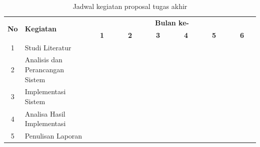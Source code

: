  
\begin{table}[h!]
  \centering
    \caption{Jadwal kegiatan proposal tugas akhir}
  \label{Novella}
  \begin{tabular}{|c|m{2.5cm}|m{0.01cm}|m{0.01cm}|m{0.01cm}|m{0.01cm}|m{0.01cm}|m{0.01cm}|m{0.01cm}|m{0.01cm}|m{0.01cm}|m{0.01cm}|m{0.01cm}|m{0.01cm}|m{0.01cm}|m{0.01cm}|m{0.01cm}|m{0.01cm}|m{0.01cm}|m{0.01cm}|m{0.01cm}|m{0.01cm}|m{0.01cm}|m{0.01cm}|m{0.01cm}|m{0.01cm}|}
    \hline
    \multirow{2}{*}{\textbf{No}} & \multirow{2}{*}{\textbf{Kegiatan}} & \multicolumn{24}{|c|}{\textbf{Bulan ke-}} \\
    \hhline{~~------------------------}
    {} & {} & \multicolumn{4}{|c|}{\textbf{1}} & \multicolumn{4}{|c|}{\textbf{2}} & \multicolumn{4}{|c|}{\textbf{3}} & \multicolumn{4}{|c|}{\textbf{4}} & \multicolumn{4}{|c|}{\textbf{5}} & \multicolumn{4}{|c|}{\textbf{6}}\\
    \hline
    1 & Studi Literatur & \cellcolor{blue!25} & \cellcolor{blue!25} & \cellcolor{blue!25} & \cellcolor{blue!25}& \cellcolor{blue!25} & \cellcolor{blue!25} & \cellcolor{blue!25} & \cellcolor{blue!25}& \cellcolor{blue!25} & \cellcolor{blue!25} & \cellcolor{blue!25} & \cellcolor{blue!25}& \cellcolor{blue!25} & \cellcolor{blue!25} & \cellcolor{blue!25} & \cellcolor{blue!25}& \cellcolor{blue!25} & \cellcolor{blue!25} & \cellcolor{blue!25} & \cellcolor{blue!25}& \cellcolor{blue!25} & \cellcolor{blue!25} & \cellcolor{blue!25} & \cellcolor{blue!25}\\
    \hline
    2 & Analisis dan Perancangan Sistem &  {} & {} & {} & {}  & \cellcolor{blue!25} & \cellcolor{blue!25} & \cellcolor{blue!25} & \cellcolor{blue!25} & \cellcolor{blue!25} & \cellcolor{blue!25} & \cellcolor{blue!25} & \cellcolor{blue!25} & {} & {} & {} & {}& {} & {} & {} & {}& {} & {} & {} & {}\\
    \hline
    3 & Implementasi Sistem &  {} & {} & {} & {} & {} & {} & {} & {}& \cellcolor{blue!25} & \cellcolor{blue!25} & \cellcolor{blue!25} & \cellcolor{blue!25} & \cellcolor{blue!25} & \cellcolor{blue!25} & \cellcolor{blue!25} & \cellcolor{blue!25} & {} & {} & {} & {}& {} & {} & {} & {}\\
    \hline
    4 & Analisa Hasil Implementasi &  {} & {} & {} & {} & {} & {} & {} & {}& {} & {} & {} & {} & \cellcolor{blue!25} & \cellcolor{blue!25} & \cellcolor{blue!25} & \cellcolor{blue!25} & \cellcolor{blue!25} & \cellcolor{blue!25} & \cellcolor{blue!25} & \cellcolor{blue!25} & {} & {} & {} & {}\\
    \hline
    5 & Penulisan Laporan & {} & {} & {} & {} & \cellcolor{blue!25} & \cellcolor{blue!25} & \cellcolor{blue!25} & \cellcolor{blue!25}& \cellcolor{blue!25} & \cellcolor{blue!25} & \cellcolor{blue!25} & \cellcolor{blue!25}& \cellcolor{blue!25} & \cellcolor{blue!25} & \cellcolor{blue!25} & \cellcolor{blue!25}& \cellcolor{blue!25} & \cellcolor{blue!25} & \cellcolor{blue!25} & \cellcolor{blue!25}& \cellcolor{blue!25} & \cellcolor{blue!25} & \cellcolor{blue!25} & \cellcolor{blue!25}\\
    \hline
  \end{tabular}
\end{table}

